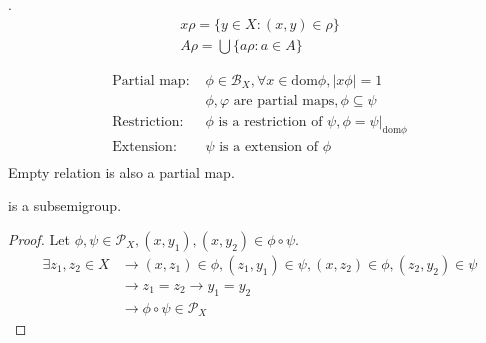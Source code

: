 \begin{Def}.
    \begin{align*}
        x\rho=\{y\in X: (x,y)\in\rho\}  \\
        A\rho=\bigcup\{a\rho:a\in A\}
    \end{align*}
\end{Def}

\begin{Def}
    \begin{align*}
        \text{Partial map: } &\phi \in \mathcal{B}_X, \forall x\in \mathrm{dom }\phi, |x\phi|=1 \\
        & \phi, \varphi \text{ are partial maps}, \phi \subseteq \psi    \\
        \text{Restriction: } & \phi \text{ is a restriction of } \psi, \phi = \psi|_{\mathrm{dom }\phi}  \\
        \text{Extension: } & \psi \text{ is a extension of } \phi   \\
    \end{align*}
    Empty relation is also a partial map.
\end{Def}

\begin{Prop} is a subsemigroup.
    \begin{proof}
        Let $\phi ,\psi \in \mathcal{P}_X, (x,y_1),(x,y_2)\in \phi \circ \psi $.
        \begin{align*}
            \exists z_1,z_2\in X &\rightarrow (x,z_1) \in \phi ,(z_1,y_1)\in \psi, (x,z_2)\in \phi ,(z_2,y_2)\in \psi    \\
            &\rightarrow z_1=z_2\rightarrow y_1=y_2  \\
            &\rightarrow \phi \circ \psi \in \mathcal{P}_X
        \end{align*}
    \end{proof}
\end{Prop}

